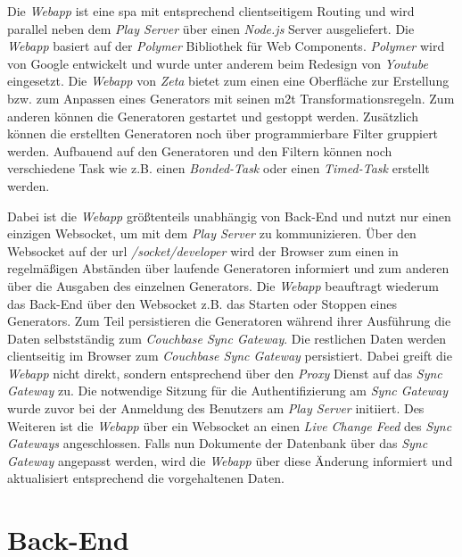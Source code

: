 Die \textit{Webapp} ist eine \ac{spa} mit entsprechend clientseitigem Routing und wird parallel neben dem \textit{Play Server} über einen \textit{Node.js} Server ausgeliefert. Die \textit{Webapp} basiert auf der \textit{Polymer} Bibliothek für Web Components. \textit{Polymer} wird von Google entwickelt und wurde unter anderem beim Redesign von \textit{Youtube} eingesetzt. Die \textit{Webapp} von \textit{Zeta} bietet zum einen eine Oberfläche zur Erstellung bzw. zum Anpassen eines Generators mit seinen \ac{m2t} Transformationsregeln. Zum anderen können die Generatoren gestartet und gestoppt werden. Zusätzlich können die erstellten Generatoren noch über programmierbare Filter gruppiert werden. Aufbauend auf den Generatoren und den Filtern können noch verschiedene Task wie z.B. einen \textit{Bonded-Task} oder einen \textit{Timed-Task} erstellt werden.

Dabei ist die \textit{Webapp} größtenteils unabhängig von Back-End und nutzt nur einen einzigen Websocket, um mit dem \textit{Play Server} zu kommunizieren. Über den Websocket auf der \ac{url} \textit{/socket/developer} wird der Browser zum einen in regelmäßigen Abständen über laufende Generatoren informiert und zum anderen über die Ausgaben des einzelnen Generators. Die \textit{Webapp} beauftragt wiederum das Back-End über den Websocket z.B. das Starten oder Stoppen eines Generators. Zum Teil persistieren die Generatoren während ihrer Ausführung die Daten selbstständig zum \textit{Couchbase Sync Gateway}. Die restlichen Daten werden clientseitig im Browser zum \textit{Couchbase Sync Gateway} persistiert. Dabei greift die \textit{Webapp} nicht direkt, sondern entsprechend über den \textit{Proxy} Dienst auf das \textit{Sync Gateway} zu. Die notwendige Sitzung für die Authentifizierung am \textit{Sync Gateway} wurde zuvor bei der Anmeldung des Benutzers am \textit{Play Server} initiiert. Des Weiteren ist die \textit{Webapp} über ein Websocket an einen \textit{Live Change Feed} des \textit{Sync Gateways} angeschlossen. Falls nun Dokumente der Datenbank über das \textit{Sync Gateway} angepasst werden, wird die \textit{Webapp} über diese Änderung informiert und aktualisiert entsprechend die vorgehaltenen Daten.

\section{Back-End}


